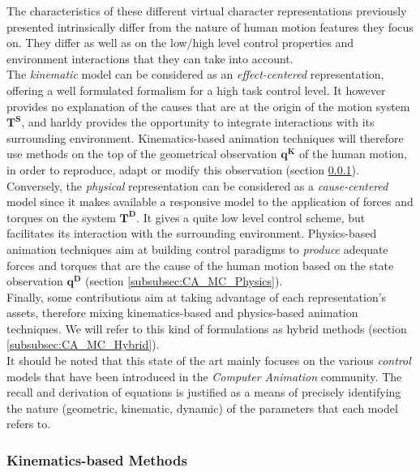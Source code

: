 The characteristics of these different virtual character representations previously presented intrinsically differ from the nature of human motion features they focus on. They differ as well as on the low/high level control properties and environment interactions that they can take into account.\\

The \emph{kinematic} model can be considered as an \emph{effect-centered} representation, offering a well formulated formalism for a high task control level. It however provides no explanation of the causes that are at the origin of the motion system $\boldsymbol{T^S}$, and harldy provides the opportunity to integrate interactions with its surrounding environment. Kinematics-based animation techniques will therefore use methods on the top of the geometrical observation $\boldsymbol{q^K}$ of the human motion, in order to reproduce, adapt or modify this observation (section \ref{subsubsec:CA_MC_Kinematics}).\\

Conversely, the \emph{physical} representation can be considered as a \emph{cause-centered} model since it makes available a responsive model to the application of forces and torques on the system $\boldsymbol{T^D}$. It gives a quite low level control scheme, but facilitates its interaction with the surrounding environment. Physics-based animation techniques aim at building control paradigms to \emph{produce} adequate forces and torques that are the cause of the human motion based on the state observation $\boldsymbol{q^D}$ (section \ref{subsubsec:CA_MC_Physics}).\\

Finally, some contributions aim at taking advantage of each representation's assets, therefore mixing kinematics-based and physics-based animation techniques. We will refer to this kind of formulations as hybrid methods (section \ref{subsubsec:CA_MC_Hybrid}).\\

It should be noted that this state of the art mainly focuses on the various \emph{control} models that have been introduced in the \emph{Computer Animation} community. The recall and derivation of equations is justified as a means of precisely identifying the nature (geometric, kinematic, dynamic) of the parameters that each model refers to.


			\subsubsection{Kinematics-based Methods}
			\label{subsubsec:CA_MC_Kinematics}

